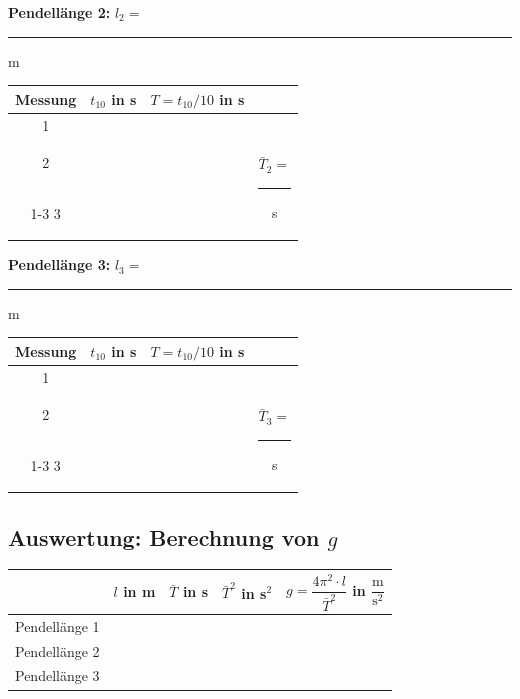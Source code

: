 \documentclass[11pt,a4paper]{scrartcl}
\begin{document}
	\vspace{0.5cm}
	
	\textbf{Pendellänge 2:} $l_2 = $ \rule{3cm}{0.4pt} m
	
	\vspace{0.2cm}
	
	\begin{center}
		\renewcommand{\arraystretch}{2.2}
		\begin{tabular}{|c|c|c|c|}
			\hline
			\textbf{Messung} & $t_{10}$ in s & $T = t_{10}/10$ in s & \\
			\hline
			1 & & & \\
			\hline
			2 & & & \multirow{2}{*}{$\bar{T}_2 = $ \rule{2cm}{0.4pt} s} \\
			\cline{1-3}
			3 & & & \\
			\hline
		\end{tabular}
	\end{center}
	
	\vspace{0.5cm}
	
	\textbf{Pendellänge 3:} $l_3 = $ \rule{3cm}{0.4pt} m
	
	\vspace{0.2cm}
	
	\begin{center}
		\renewcommand{\arraystretch}{2.2}
		\begin{tabular}{|c|c|c|c|}
			\hline
			\textbf{Messung} & $t_{10}$ in s & $T = t_{10}/10$ in s & \\
			\hline
			1 & & & \\
			\hline
			2 & & & \multirow{2}{*}{$\bar{T}_3 = $ \rule{2cm}{0.4pt} s} \\
			\cline{1-3}
			3 & & & \\
			\hline
		\end{tabular}
	\end{center}
	
	\newpage
	
	\subsection*{Auswertung: Berechnung von $g$}
	
	\begin{center}
		\renewcommand{\arraystretch}{2.5}
		\begin{tabular}{|c|c|c|c|c|}
			\hline
			& $l$ in m & $\bar{T}$ in s & $\bar{T}^2$ in s$^2$ & $g = \dfrac{4\pi^2 \cdot l}{\bar{T}^2}$ in $\dfrac{\text{m}}{\text{s}^2}$ \\
			\hline
			Pendellänge 1 & & & & \\
			\hline
			Pendellänge 2 & & & & \\
			\hline
			Pendellänge 3 & & & & \\
			\hline
		\end{tabular}
	\end{center}
	
\end{document}
